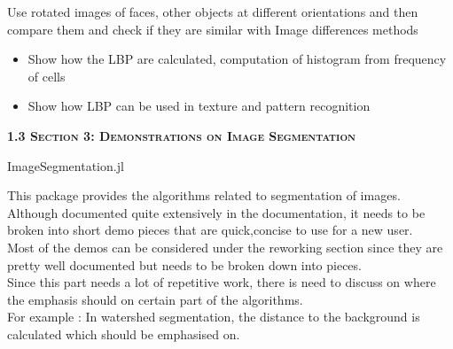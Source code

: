 \begin{enumerate}
\begin{displayquote}
       Use rotated images of faces, other objects at different orientations and then compare them and check if they are similar with Image differences methods
    \end{displayquote}
    \begin{itemize}
        \item Show how the LBP are calculated, computation of histogram from frequency of cells
        \item Show how LBP can be used in texture and pattern recognition
    \end{itemize}
\end{enumerate}

\vspace{0.5cm}
\Large
\textbf{\textsc{1.3 Section 3: Demonstrations on Image Segmentation}}

\vspace{0.5cm}
\Large
\textsf{ImageSegmentation.jl}

\vspace{0.5cm}
\large
This package provides the algorithms related to segmentation of images. Although documented quite extensively in the documentation, it needs to be broken into short demo pieces that are quick,concise to use for a new user.\\
Most of the demos can be considered under the reworking section since they are pretty well documented but needs to be broken down into pieces.\\
Since this part needs a lot of repetitive work, there is need to discuss on where the emphasis should on certain part of the algorithms.\\ 
For example : In watershed segmentation, the distance to the background is calculated which should be emphasised on.\\

